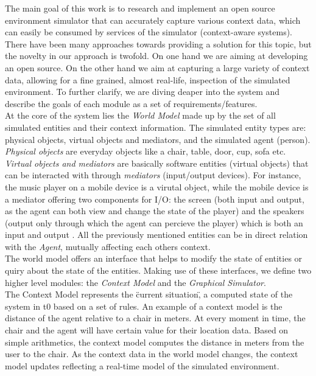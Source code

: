 The main goal of this work is to research and implement an open source environment simulator that can accurately capture various context data, which can easily be consumed by services of the simulator (context-aware systems). There have been many approaches towards providing a solution for this topic, but the novelty in our approach is twofold. On one hand we are aiming at developing an open source. On the other hand we aim at capturing a large variety of context data, allowing for a fine grained, almost real-life, inspection of the simulated environment. To further clarify, we are diving deaper into the system and describe the goals of each module as a set of requirements/features.\\

At the core of the system lies the \emph{World Model} made up by the set of all simulated entities and their context information. The simulated entity types are: physical objects, virtual objects and mediators, and the simulated agent (person). \emph{Physical objects} are everyday objects like a chair, table, door, cup, sofa etc. \emph{Virtual objects and mediators} are basically software entities (virtual objects) that can be interacted with through \emph{mediators} (input/output devices). For instance, the music player on a mobile device is a virutal object, while the mobile device is a mediator offering two components for I/O: the screen (both input and output, as the agent can both view and change the state of the player) and the speakers (output only through which the agent can percieve the player) which is both an input and output \cite{pederson2011situative}. All the previously mentioned entities can be in direct relation with the \emph{Agent}, mutually affecting each others context.\\

The world model offers an interface that helps to modify the state of entities or quiry about the state of the entities. Making use of these interfaces, we define two higher level modules: the \emph{Context Model} and the \emph{Graphical Simulator}.\\

The Context Model represents the \"current situation\", a computed state of the system in t0 based on a set of rules. An example of a context model is the distance of the agent relative to a chair in meters. At every moment in time, the chair and the agent will have certain value for their location data. Based on simple arithmetics, the context model computes the distance in meters from the user to the chair. As the context data in the world model changes, the context model updates reflecting a real-time model of the simulated environment.\\

